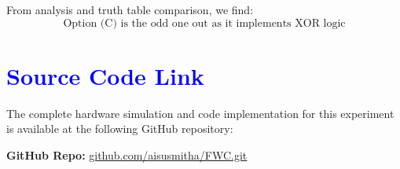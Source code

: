 \documentclass[twocolumn]{article}
\begin{document}
From analysis and truth table comparison, we find:
\[
\boxed{\text{Option (C) is the odd one out as it implements XOR logic}}
\]

\section*{\textcolor{blue}{Source Code Link}}
The complete hardware simulation and code implementation for this experiment is available at the following GitHub repository:

\textbf{GitHub Repo:} \href{https://github.com/aisusmitha/FWC.git}{github.com/aisusmitha/FWC.git}
\end{document}
